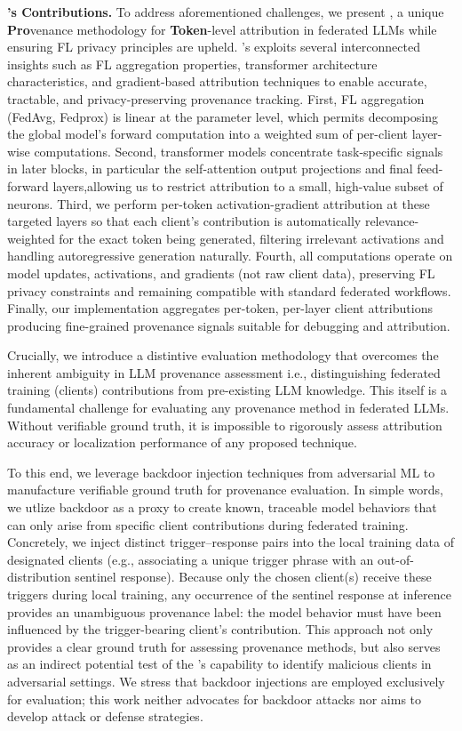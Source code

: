 \textbf{\tool's Contributions.} 
To address aforementioned challenges, we present \tool, a unique \textbf{Pro}venance methodology for \textbf{Token}-level  attribution in federated LLMs while ensuring FL privacy principles are upheld. 
\tool's exploits several interconnected insights such as FL aggregation properties, transformer architecture characteristics, and gradient-based attribution techniques to enable accurate, tractable, and privacy-preserving provenance tracking. 
First, FL aggregation (\eg FedAvg, Fedprox) is linear at the parameter level, which permits decomposing the global model's forward computation into a weighted sum of per-client layer-wise computations. 
Second, transformer models concentrate task-specific signals in later blocks, in particular the self-attention output projections and final feed-forward layers,allowing us to restrict attribution to a small, high-value subset of neurons. 
Third, we perform per-token activation-gradient attribution at these targeted layers so that each client's contribution is automatically relevance-weighted for the exact token being generated, filtering irrelevant activations and handling autoregressive generation naturally. 
Fourth, all computations operate on model updates, activations, and gradients (not raw client data), preserving FL privacy constraints and remaining compatible with standard federated workflows. 
Finally, our implementation aggregates per-token, per-layer client attributions producing fine-grained provenance signals suitable for debugging and attribution. 

Crucially, we introduce a distintive evaluation methodology that overcomes the inherent ambiguity in LLM provenance assessment i.e., distinguishing federated training (\ie clients) contributions from pre-existing LLM knowledge. 
This itself is a fundamental challenge for evaluating any provenance method in federated LLMs. Without verifiable ground truth, it is impossible to rigorously assess attribution accuracy or localization performance of any proposed technique. 

To this end, we leverage backdoor injection techniques from adversarial ML to manufacture verifiable ground truth for provenance evaluation. 
In simple words, we utlize backdoor as a proxy to create known, traceable model behaviors that can only arise from specific client contributions during federated training.
Concretely, we inject distinct trigger–response pairs into the local training data of designated clients (e.g., associating a unique trigger phrase with an out-of-distribution sentinel response). 
Because only the chosen client(s) receive these triggers during local training, any occurrence of the sentinel response at inference provides an unambiguous provenance label: the model behavior must have been influenced by the trigger-bearing client's contribution. 
This approach not only provides a clear ground truth for assessing provenance methods, but also serves as an indirect potential test of the \tool's capability to identify malicious clients in adversarial settings. 
We stress that backdoor injections are employed exclusively for evaluation; this work neither advocates for backdoor attacks nor aims to develop attack or defense strategies.


